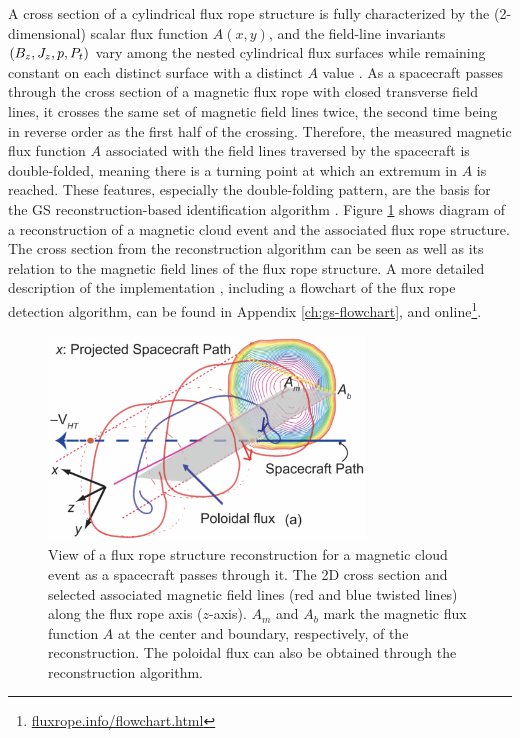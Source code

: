 A cross section of a cylindrical flux rope structure is fully characterized by the (2-dimensional) scalar flux function $A(x, y)$, and the field-line invariants $\left( B_z,J_z,p, P_t \right)$ vary among the nested cylindrical flux surfaces while remaining constant on each distinct surface with a distinct $A$ value \cite{Hu:2018}. As a spacecraft passes through the cross section of a magnetic flux rope with closed transverse field lines, it crosses the same set of magnetic field lines twice, the second time being in reverse order as the first half of the crossing. Therefore, the measured magnetic flux function $A$ associated with the field lines traversed by the spacecraft is double-folded, meaning there is a turning point at which an extremum in $A$ is reached. These features, especially the double-folding pattern, are the basis for the GS reconstruction-based identification algorithm \cite{Hu:2018}. Figure \ref{fig:GSreconstruction_Hu2017} shows diagram of a reconstruction of a magnetic cloud event and the associated flux rope structure. The cross section from the reconstruction algorithm can be seen as well as its relation to the magnetic field lines of the flux rope structure.
A more detailed description of the implementation \cite{Hu:2018}, including a flowchart of the flux rope detection algorithm, can be found in Appendix \ref{ch:gs-flowchart}, and online\footnote{\url{fluxrope.info/flowchart.html}}.

\begin{figure}[h!]
    \centering
    \includegraphics[width=0.75\textwidth]{Figures/Hu2017_5a.png}
    \caption[2D cross section view of a flux rope structure reconstruction] {View of a flux rope structure reconstruction for a magnetic cloud event \cite{Hu:2015} as a spacecraft passes through it. The 2D cross section and selected associated magnetic field lines (red and blue twisted lines) along the flux rope axis ($z$-axis). $A_m$ and $A_b$ mark the magnetic flux function $A$ at the center and boundary, respectively, of the reconstruction. The poloidal flux can also be obtained through the reconstruction algorithm.} %
    \label{fig:GSreconstruction_Hu2017}
\end{figure}


